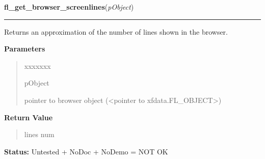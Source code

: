 \hspace{.8\funcindent}\begin{boxedminipage}{\funcwidth}

    \raggedright \textbf{fl\_get\_browser\_screenlines}(\textit{pObject})

    \vspace{-1.5ex}

    \rule{\textwidth}{0.5\fboxrule}
\setlength{\parskip}{2ex}
    Returns an approximation of the number of lines shown in the browser.

\setlength{\parskip}{1ex}
      \textbf{Parameters}
      \vspace{-1ex}

      \begin{quote}
        \begin{Ventry}{xxxxxxx}

          \item[pObject]

          pointer to browser object ({\textless}pointer to 
          xfdata.FL\_OBJECT{\textgreater})

        \end{Ventry}

      \end{quote}

      \textbf{Return Value}
    \vspace{-1ex}

      \begin{quote}
      lines num

      \end{quote}

\textbf{Status:} Untested + NoDoc + NoDemo = NOT OK



    \end{boxedminipage}

    \label{xformslib:library:fl_set_browser_topline}

    \vspace{0.5ex}

